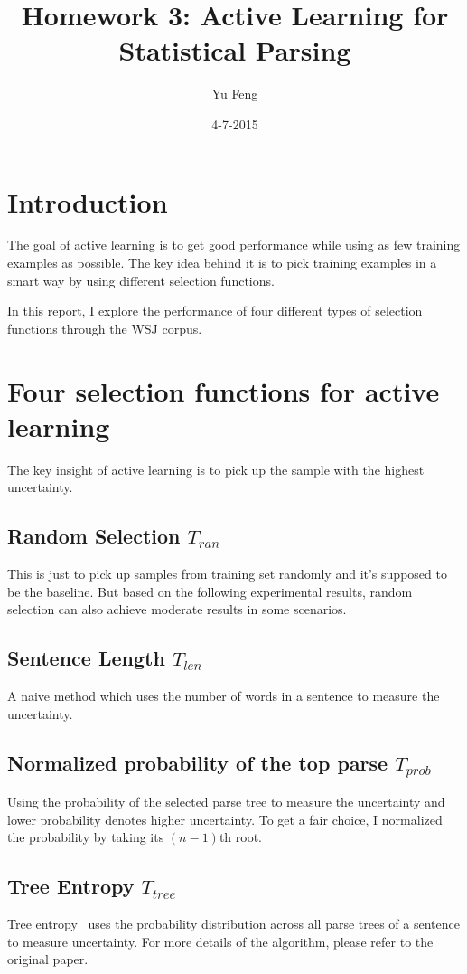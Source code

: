 \documentclass[10pt]{article}
\title{Homework 3: Active Learning for Statistical Parsing}
\author{Yu Feng}
\date{4-7-2015}
\begin{document}
\maketitle

\section{Introduction}\label{sec:intro}
The goal of active learning is to get good performance while using as few training
examples as possible. The key idea behind it is to pick training examples in a 
smart way by using different selection functions.

In this report, I explore the performance of four different types of selection
 functions through the WSJ corpus.
 
\section{Four selection functions for active learning}\label{sec:alg}
The key insight of active learning is to pick up the sample with the highest 
uncertainty.  
\subsection{Random Selection $T_{ran}$}
This is just to pick up samples from training set randomly and it's supposed to be
the baseline. But based on the following experimental results, random selection
can also achieve moderate results in some scenarios.

\subsection{Sentence Length $T_{len}$}
A naive method which uses the number of words in a sentence to measure the uncertainty.

\subsection{Normalized probability of the top parse $T_{prob}$}
Using the probability of the selected parse tree to measure the uncertainty and lower 
probability denotes higher uncertainty. To get a fair choice, I normalized the 
probability by taking its $(n-1)$th root.

\subsection{Tree Entropy $T_{tree}$}
Tree entropy~\cite{hwa} uses the probability distribution across all parse trees of a
sentence to measure uncertainty. For more details of the algorithm, please refer to 
the original paper.
\end{document}
